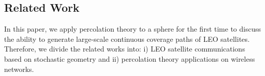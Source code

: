 \documentclass[final]{IEEEtran}
\begin{document}
\subsection{Related Work}
 In this paper, we apply percolation theory to a sphere for the first time to discuss the ability to generate large-scale continuous coverage paths of LEO satellites. Therefore, we divide the related works into: i) LEO satellite communications based on stochastic geometry and ii) percolation theory applications on wireless networks.\\%
\end{document}
